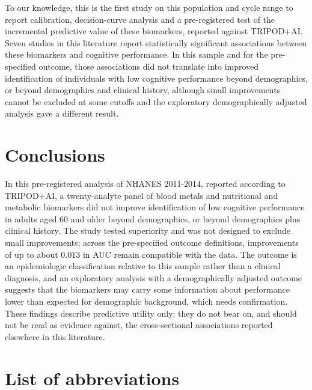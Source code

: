\documentclass[12pt]{article}
\begin{document}
To our knowledge, this is the first study on this population and cycle range to report calibration, decision-curve analysis and a pre-registered test of the incremental predictive value of these biomarkers, reported against TRIPOD+AI. Seven studies in this literature report statistically significant associations between these biomarkers and cognitive performance. In this sample and for the pre-specified outcome, those associations did not translate into improved identification of individuals with low cognitive performance beyond demographics, or beyond demographics and clinical history, although small improvements cannot be excluded at some cutoffs and the exploratory demographically adjusted analysis gave a different result.

\section*{Conclusions}

In this pre-registered analysis of NHANES 2011-2014, reported according to TRIPOD+AI, a twenty-analyte panel of blood metals and nutritional and metabolic biomarkers did not improve identification of low cognitive performance in adults aged 60 and older beyond demographics, or beyond demographics plus clinical history. The study tested superiority and was not designed to exclude small improvements; across the pre-specified outcome definitions, improvements of up to about $0.013$ in AUC remain compatible with the data. The outcome is an epidemiologic classification relative to this sample rather than a clinical diagnosis, and an exploratory analysis with a demographically adjusted outcome suggests that the biomarkers may carry some information about performance lower than expected for demographic background, which needs confirmation. These findings describe predictive utility only; they do not bear on, and should not be read as evidence against, the cross-sectional associations reported elsewhere in this literature.

\section*{List of abbreviations}
\end{document}
